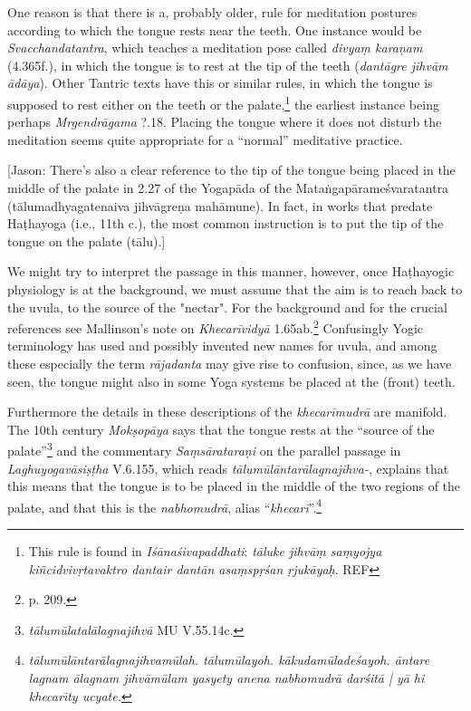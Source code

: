 \begin{ekdosis}
\begin{philcomm}[hp01_045]
One reason is that there is a, probably older, rule for meditation postures according to which the
tongue rests near the teeth. One instance would be \emph{Svacchandatantra}, which teaches a
meditation pose called \emph{divyaṃ karaṇam} (4.365f.), in which the tongue is to rest at the tip
of the teeth (\emph{dantāgre jihvām ādāya}). Other Tantric texts have this or similar rules, in
which the tongue is supposed to rest either on the teeth or the palate,\footnote{This rule is
found in \emph{Iśānaśivapaddhati}: \emph{tāluke jihvāṃ saṃyojya kiñcidvivṛtavaktro dantair dantān
  asaṃspṛśan ṛjukāyaḥ}. REF} the earliest instance being perhaps \emph{Mrgendrāgama} ?.18.
Placing the tongue where it does not disturb the meditation seems quite appropriate for a
``normal'' meditative practice.

[Jason: There’s also a clear reference to the tip of the tongue being placed in the middle of the palate in 2.27 of the Yogapāda of the Mataṅgapārameśvaratantra (tālumadhyagatenaiva jihvāgreṇa mahāmune). In fact, in works that predate Haṭhayoga (i.e., 11th c.), the most common instruction is to put the tip of the tongue on the palate (tālu).]

We might try to interpret the passage in this manner, however, once Haṭhayogic physiology is at the
background, we must assume that the aim is to reach back to the uvula, to the source of the
"nectar".  For the background and for the crucial references see Mallinson's note on
\emph{Khecarīvidyā} 1.65ab.\footnote{p. 209.}  Confusingly Yogic terminology has used and possibly
invented new names for uvula, and among these especially the term \emph{rājadanta} may give rise to
confusion, since, as we have seen, the tongue might also in some Yoga systems be placed at the
(front) teeth.

Furthermore the details in these descriptions of the \emph{khecarīmudrā} are manifold. The 10th
century \emph{Mokṣopāya} says that the tongue rests at the ``source of the
palate''\footnote{\emph{tālumūlatalālagnajihvā} MU V.55.14c.} and the commentary
\emph{Saṃsārataraṇi} on the parallel passage in \emph{Laghuyogavāsiṣṭha} V.6.155, which reads
\emph{tālumūlāntarālagnajihva-}, explains that this means that the tongue is to be placed in the
middle of the two regions of the palate, and that this is the \emph{nabhomudrā}, alias
``\emph{khecarī}''.\footnote{\emph{tālumūlāntarālagnajihvamūlah. tālumūlayoh. kākudamūladeśayoh. āntare
  lagnam ālagnam jihvāmūlam yasyety anena nabhomudrā darśitā | yā hi khecarı̄ty ucyate.}}


\end{philcomm}
\end{ekdosis}
